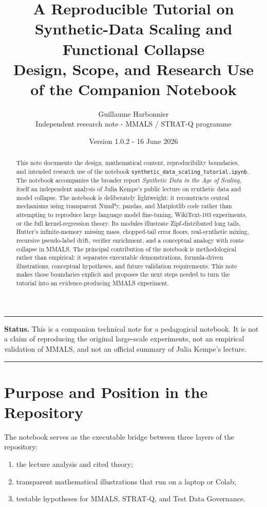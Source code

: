 \documentclass[10pt]{article}
\title{\textbf{A Reproducible Tutorial on Synthetic-Data Scaling and Functional Collapse}\\
\large Design, Scope, and Research Use of the Companion Notebook}
\author{Guillaume Harbonnier\\
\small Independent research note - MMALS / STRAT-Q programme}
\date{Version 1.0.2 - 16 June 2026}
\newenvironment{statusbox}{%
  \begin{center}\begin{minipage}{0.94\textwidth}\color{deepblue}\rule{\linewidth}{0.5pt}\par\vspace{0.3em}\noindent\textbf{Status.} }%
  {\par\vspace{0.3em}\rule{\linewidth}{0.5pt}\end{minipage}\end{center}}
\begin{document}
\maketitle

\begin{abstract}
This note documents the design, mathematical content, reproducibility boundaries, and intended research use of the notebook \texttt{synthetic\_data\_scaling\_tutorial.ipynb}. The notebook accompanies the broader report \emph{Synthetic Data in the Age of Scaling}, itself an independent analysis of Julia Kempe's public lecture on synthetic data and model collapse. The notebook is deliberately lightweight: it reconstructs central mechanisms using transparent NumPy, pandas, and Matplotlib code rather than attempting to reproduce large language model fine-tuning, WikiText-103 experiments, or the full kernel-regression theory. Its modules illustrate Zipf-distributed long tails, Hutter's infinite-memory missing mass, chopped-tail error floors, real-synthetic mixing, recursive pseudo-label drift, verifier enrichment, and a conceptual analogy with route collapse in MMALS. The principal contribution of the notebook is methodological rather than empirical: it separates executable demonstrations, formula-driven illustrations, conceptual hypotheses, and future validation requirements. This note makes those boundaries explicit and proposes the next steps needed to turn the tutorial into an evidence-producing MMALS experiment.
\end{abstract}

\begin{statusbox}
This is a companion technical note for a pedagogical notebook. It is not a claim of reproducing the original large-scale experiments, not an empirical validation of MMALS, and not an official summary of Julia Kempe's lecture.
\end{statusbox}

\tableofcontents

\section{Purpose and Position in the Repository}

The notebook serves as the executable bridge between three layers of the repository:
\begin{enumerate}[leftmargin=*]
  \item the lecture analysis and cited theory;
  \item transparent mathematical illustrations that run on a laptop or Colab;
  \item testable hypotheses for MMALS, STRAT-Q, and Test Data Governance.
\end{enumerate}
\end{document}
